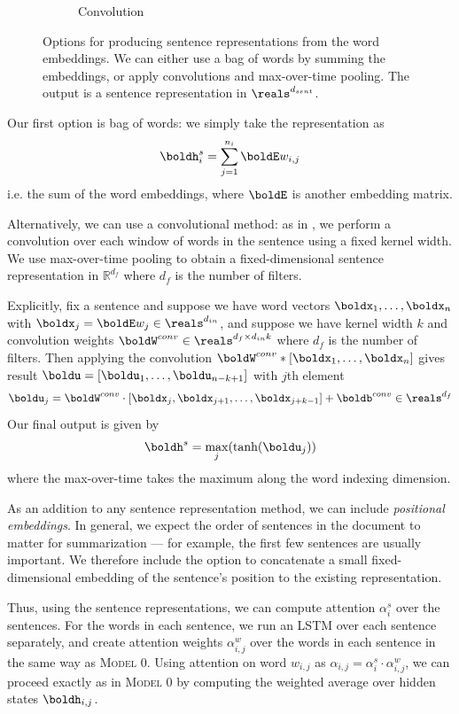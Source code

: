 \documentclass[12pt]{report}
\begin{document}
\begin{figure}[t]
\begin{subfigure}{0.45\textwidth}
  \caption[Convolutional Encoder]{Convolution}
	\label{fig:bow_encoder_conv}
\end{subfigure}
\caption[Sentence Representation Encoders]{Options for producing sentence representations from the word embeddings. We can either use a bag of words by summing the embeddings, or apply convolutions and max-over-time pooling. The output is a sentence representation in $\reals^{d_{sent}}$. }
\label{fig:sent_reps}
\end{figure}

Our first option is bag of words: we simply take the representation as
\begin{equation}
\boldh_i^s = \sum_{j=1}^{n_i} \boldE w_{i,j}
\end{equation}
i.e. the sum of the word embeddings, where $\boldE$ is another embedding matrix.

Alternatively, we can use a convolutional method: as in \citet{kim2014convolutional}, we perform a convolution over each window of words in the sentence using a fixed kernel width. We use max-over-time pooling to obtain a fixed-dimensional sentence representation in $\mathbb{R}^{d_f}$ where $d_f$ is the number of filters.

Explicitly, fix a sentence and suppose we have word vectors $\boldx_1, \ldots, \boldx_n$ with $\boldx_j = \boldE w_j \in \reals^{d_{in}}$, and suppose we have kernel width $k$ and convolution weights $\boldW^{conv} \in \reals^{d_f \times d_{in} k}$ where $d_f$ is the number of filters. Then applying the convolution
$\boldW^{conv} * [\boldx_1, \ldots, \boldx_n]$ gives result $\boldu = [\boldu_1, \ldots, \boldu_{n-k+1}]$ with $j$th element
$$\boldu_j = \boldW^{conv} \cdot [\boldx_j, \boldx_{j+1}, \ldots, \boldx_{j+k-1}] + \boldb^{conv} \in \reals^{d_f}$$
Our final output is given by 
\begin{equation}
\boldh^s = \max_j(\tanh(\boldu_j))
\end{equation}
where the max-over-time takes the maximum along the word indexing dimension.

As an addition to any sentence representation method, we can include \emph{positional embeddings}. In general, we expect the order of sentences in the document to matter for summarization --- for example, the first few sentences are usually important.
We therefore include the option to concatenate a small fixed-dimensional embedding of the sentence's position to the existing representation.

Thus, using the sentence representations, we can compute attention $\alpha_i^s$ over the sentences.
For the words in each sentence, we run an LSTM over each sentence separately, and create attention weights $\alpha_{i,j}^w$ over the words in each sentence in the same way as \textsc{Model 0}. Using attention on word $w_{i,j}$ as  $\alpha_{i,j} = \alpha_i^s \cdot \alpha_{i,j}^w$, we can proceed exactly as in \textsc{Model 0} by computing the weighted average over hidden states $\boldh_{i,j}$.
\end{document}
